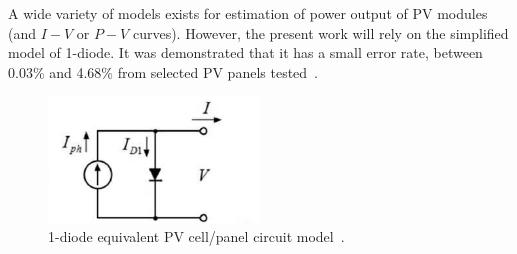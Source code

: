 \documentclass[review]{elsarticle}
\begin{document}
%
%
% 
A wide variety of models exists for estimation of power output of PV modules (and $I-V$ or $P-V$ curves). However, the present work will rely on the simplified model of 1-diode. It was demonstrated that it has a small error rate, between 0.03\% and 4.68\% from selected PV panels tested~\cite{Saloux}.

\begin{figure}[h]
\includegraphics[width=0.50\textwidth]{equivckt1D}
\centering
\caption{1-diode equivalent PV cell/panel circuit model~\cite{Cubas}.}
\label{fig:equivckt}
\end{figure}
\end{document}
